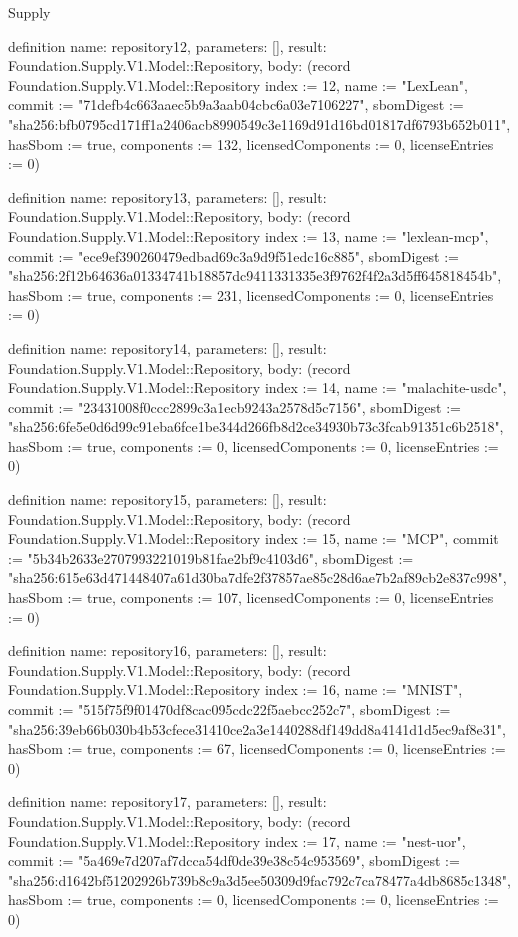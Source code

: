 \begin{lexlean}{Supply}
\begin{semanticmodule}
definition{
  name: repository12,
  parameters: [],
  result: Foundation.Supply.V1.Model::Repository,
  body: (record Foundation.Supply.V1.Model::Repository {index := 12, name := "LexLean", commit := "71defb4c663aaec5b9a3aab04cbc6a03e7106227", sbomDigest := "sha256:bfb0795cd171ff1a2406acb8990549c3e1169d91d16bd01817df6793b652b011", hasSbom := true, components := 132, licensedComponents := 0, licenseEntries := 0})
}

definition{
  name: repository13,
  parameters: [],
  result: Foundation.Supply.V1.Model::Repository,
  body: (record Foundation.Supply.V1.Model::Repository {index := 13, name := "lexlean-mcp", commit := "ece9ef390260479edbad69c3a9d9f51edc16c885", sbomDigest := "sha256:2f12b64636a01334741b18857dc9411331335e3f9762f4f2a3d5ff645818454b", hasSbom := true, components := 231, licensedComponents := 0, licenseEntries := 0})
}

definition{
  name: repository14,
  parameters: [],
  result: Foundation.Supply.V1.Model::Repository,
  body: (record Foundation.Supply.V1.Model::Repository {index := 14, name := "malachite-usdc", commit := "23431008f0ccc2899c3a1ecb9243a2578d5c7156", sbomDigest := "sha256:6fe5e0d6d99c91eba6fce1be344d266fb8d2ce34930b73c3fcab91351c6b2518", hasSbom := true, components := 0, licensedComponents := 0, licenseEntries := 0})
}

definition{
  name: repository15,
  parameters: [],
  result: Foundation.Supply.V1.Model::Repository,
  body: (record Foundation.Supply.V1.Model::Repository {index := 15, name := "MCP", commit := "5b34b2633e2707993221019b81fae2bf9c4103d6", sbomDigest := "sha256:615e63d471448407a61d30ba7dfe2f37857ae85c28d6ae7b2af89cb2e837c998", hasSbom := true, components := 107, licensedComponents := 0, licenseEntries := 0})
}

definition{
  name: repository16,
  parameters: [],
  result: Foundation.Supply.V1.Model::Repository,
  body: (record Foundation.Supply.V1.Model::Repository {index := 16, name := "MNIST", commit := "515f75f9f01470df8cac095cdc22f5aebcc252c7", sbomDigest := "sha256:39eb66b030b4b53cfece31410ce2a3e1440288df149dd8a4141d1d5ec9af8e31", hasSbom := true, components := 67, licensedComponents := 0, licenseEntries := 0})
}

definition{
  name: repository17,
  parameters: [],
  result: Foundation.Supply.V1.Model::Repository,
  body: (record Foundation.Supply.V1.Model::Repository {index := 17, name := "nest-uor", commit := "5a469e7d207af7dcca54df0de39e38c54c953569", sbomDigest := "sha256:d1642bf51202926b739b8c9a3d5ee50309d9fac792c7ca78477a4db8685c1348", hasSbom := true, components := 0, licensedComponents := 0, licenseEntries := 0})
}


\end{semanticmodule}
\end{lexlean}
